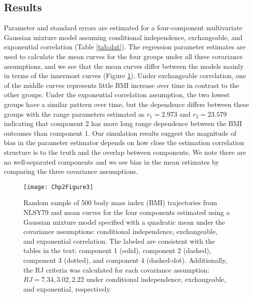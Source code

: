 \subsection{Results}
Parameter and standard errors are estimated for a four-component multivariate Gaussian mixture model assuming conditional independence, exchangeable, and exponential correlation (Table \ref{tab:dat}). The regression parameter estimates are used to calculate the mean curves for the four groups under all three covariance assumptions, and we see that the mean curves differ between the models mainly in terms of the innermost curves (Figure \ref{fig:2-3}).  Under exchangeable correlation, one of the middle curves represents little BMI increase over time in contrast to the other groups. Under the exponential correlation assumption, the two lowest groups have a similar pattern over time, but the dependence differs between these groups with the range parameters estimated as $r_1=2.973$ and $r_2=23.579$ indicating that component 2 has more long range dependence between the BMI outcomes than component 1. Our simulation results suggest the magnitude of bias in the parameter estimator depends on how close the estimation correlation structure is to the truth and the overlap between components. We note there are no well-separated components and we see bias in the mean estimates by comparing the three covariance assumptions. \\
\begin{figure}
\begin{center}
\texttt{[image: Chp2Figure3]}
\end{center}
\caption{Random sample of 500 body mass index (BMI) trajectories from NLSY79 and mean curves for the four components estimated using a Gaussian mixture model specified with a quadratic mean under the covariance assumptions: conditional independence, exchangeable, and exponential correlation. The labeled are consistent with the tables in the text: component 1 (solid), component 2 (dashed), component 3 (dotted), and component 4 (dashed-dot). Additionally, the RJ criteria was calculated for each covariance assumption: $RJ =7.34,3.02,2.22$ under conditional independence, exchangeable, and exponential, respectively.}
\label{fig:2-3}
\end{figure}

